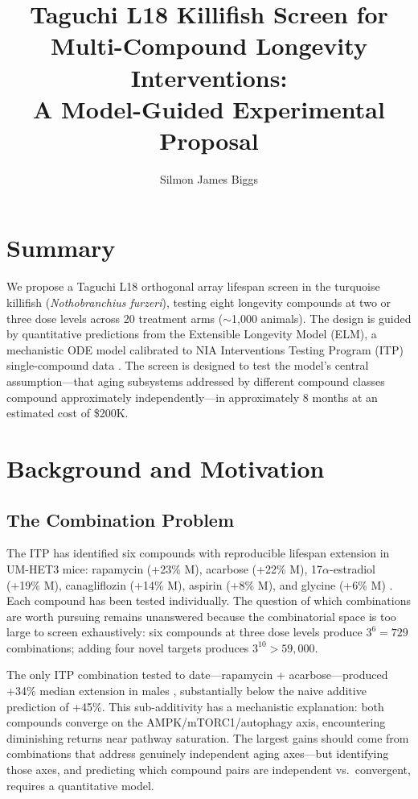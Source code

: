 \documentclass[11pt]{article}
\title{Taguchi L18 Killifish Screen for Multi-Compound Longevity Interventions:\\A Model-Guided Experimental Proposal}
\author{Silmon James Biggs}
\date{}
\begin{document}
\maketitle

\section{Summary}

We propose a Taguchi L18 orthogonal array lifespan screen in the turquoise killifish (\textit{Nothobranchius furzeri}), testing eight longevity compounds at two or three dose levels across 20 treatment arms ($\sim$1,000 animals). The design is guided by quantitative predictions from the Extensible Longevity Model (ELM), a mechanistic ODE model calibrated to NIA Interventions Testing Program (ITP) single-compound data \citep{Biggs2025elm}. The screen is designed to test the model's central assumption---that aging subsystems addressed by different compound classes compound approximately independently---in approximately 8 months at an estimated cost of \$200K.

\section{Background and Motivation}

\subsection{The Combination Problem}

The ITP has identified six compounds with reproducible lifespan extension in UM-HET3 mice: rapamycin (+23\% M), acarbose (+22\% M), 17$\alpha$-estradiol (+19\% M), canagliflozin (+14\% M), aspirin (+8\% M), and glycine (+6\% M) \citep{Miller2011rapa,Harrison2014,Stout2017,Miller2020,Strong2016,Miller2019glycine}. Each compound has been tested individually. The question of which combinations are worth pursuing remains unanswered because the combinatorial space is too large to screen exhaustively: six compounds at three dose levels produce $3^6 = 729$ combinations; adding four novel targets produces $3^{10} > 59{,}000$.

The only ITP combination tested to date---rapamycin + acarbose---produced +34\% median extension in males \citep{Strong2022}, substantially below the naive additive prediction of +45\%. This sub-additivity has a mechanistic explanation: both compounds converge on the AMPK/mTORC1/autophagy axis, encountering diminishing returns near pathway saturation. The largest gains should come from combinations that address genuinely independent aging axes---but identifying those axes, and predicting which compound pairs are independent vs.\ convergent, requires a quantitative model.
\end{document}
